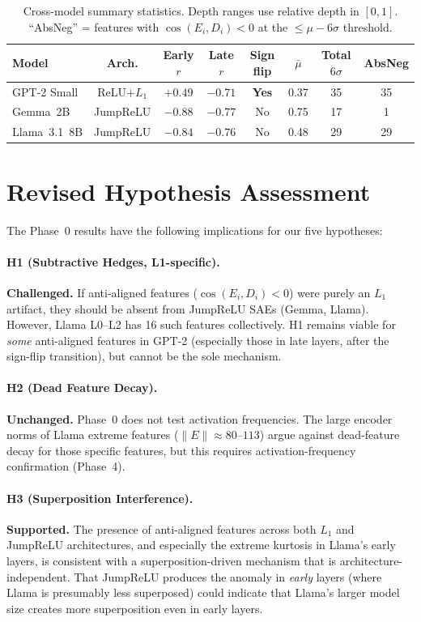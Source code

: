 \documentclass[11pt,a4paper]{article}
\newcommand{\cosED}{\cos(E_i, D_i)}
\begin{document}
\begin{table}[H]
\centering
\caption{Cross-model summary statistics. Depth ranges use relative depth in $[0, 1]$. ``AbsNeg'' = features with $\cosED < 0$ at the $\leq \mu - 6\sigma$ threshold.}
\label{tab:summary}
\begin{tabular}{@{}lccccccc@{}}
\toprule
Model & Arch. & Early $r$ & Late $r$ & Sign flip & $\bar{\mu}$ & Total $6\sigma$ & AbsNeg \\ 
\midrule
GPT-2 Small    & ReLU$+L_1$  & $+0.49$ & $-0.71$ & \textbf{Yes} & 0.37 & 35 & 35 \\
Gemma~2B       & JumpReLU    & $-0.88$ & $-0.77$ & No  & 0.75 & 17 &  1 \\
Llama~3.1~8B   & JumpReLU    & $-0.84$ & $-0.76$ & No  & 0.48 & 29 & 29 \\
\bottomrule
\end{tabular}
\end{table}

\section{Revised Hypothesis Assessment}
\label{sec:hypotheses}

The Phase~0 results have the following implications for our five hypotheses:

\paragraph{H1 (Subtractive Hedges, L1-specific).} \textbf{Challenged.} If anti-aligned features ($\cosED < 0$) were purely an $L_1$ artifact, they should be absent from JumpReLU SAEs (Gemma, Llama). However, Llama L0--L2 has 16 such features collectively. H1 remains viable for \emph{some} anti-aligned features in GPT-2 (especially those in late layers, after the sign-flip transition), but cannot be the sole mechanism.

\paragraph{H2 (Dead Feature Decay).} \textbf{Unchanged.} Phase~0 does not test activation frequencies. The large encoder norms of Llama extreme features ($\|E\| \approx 80$--$113$) argue against dead-feature decay for those specific features, but this requires activation-frequency confirmation (Phase~4).

\paragraph{H3 (Superposition Interference).} \textbf{Supported.} The presence of anti-aligned features across both $L_1$ and JumpReLU architectures, and especially the extreme kurtosis in Llama's early layers, is consistent with a superposition-driven mechanism that is architecture-independent. That JumpReLU produces the anomaly in \emph{early} layers (where Llama is presumably less superposed) could indicate that Llama's larger model size creates more superposition even in early layers.
\end{document}

